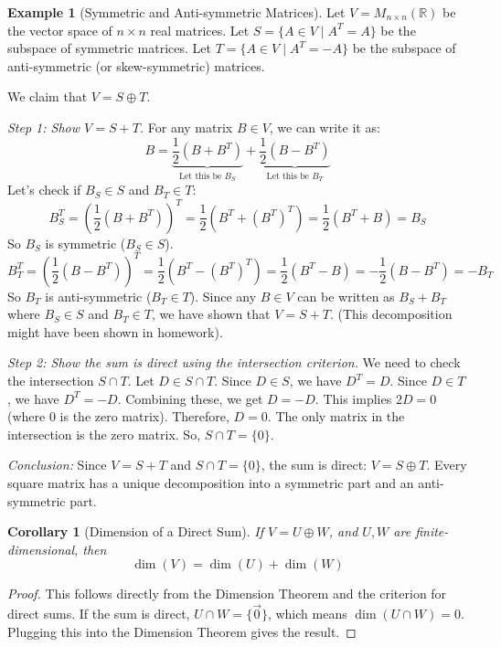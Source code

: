 \documentclass[11pt]{article}
\newtheorem{corollary}[theorem]{Corollary}
\theoremstyle{definition}
\newtheorem{example}[theorem]{Example}
\theoremstyle{remark}
\newcommand{\R}{\mathbb{R}}
\newcommand{\dimn}{\operatorname{dim}}
\newcommand{\intersect}{\cap}
\newcommand{\directsum}{\oplus}
\newcommand{\mat}[1]{M_{#1 \times #1}(\R)} %
\begin{document}
\begin{example}[Symmetric and Anti-symmetric Matrices] \label{ex:matrix_decomp}
Let $V = \mat{n}$ be the vector space of $n \times n$ real matrices.
Let $S = \{ A \in V \mid A^T = A \}$ be the subspace of symmetric matrices.
Let $T = \{ A \in V \mid A^T = -A \}$ be the subspace of anti-symmetric (or skew-symmetric) matrices.

We claim that $V = S \directsum T$.

\textit{Step 1: Show $V = S+T$.}
For any matrix $B \in V$, we can write it as:
\[ B = \underbrace{\frac{1}{2}(B + B^T)}_{\text{Let this be } B_S} + \underbrace{\frac{1}{2}(B - B^T)}_{\text{Let this be } B_T} \]
Let's check if $B_S \in S$ and $B_T \in T$:
\[ B_S^T = \left(\frac{1}{2}(B + B^T)\right)^T = \frac{1}{2}(B^T + (B^T)^T) = \frac{1}{2}(B^T + B) = B_S \]
So $B_S$ is symmetric ($B_S \in S$).
\[ B_T^T = \left(\frac{1}{2}(B - B^T)\right)^T = \frac{1}{2}(B^T - (B^T)^T) = \frac{1}{2}(B^T - B) = -\frac{1}{2}(B - B^T) = -B_T \]
So $B_T$ is anti-symmetric ($B_T \in T$).
Since any $B \in V$ can be written as $B_S + B_T$ where $B_S \in S$ and $B_T \in T$, we have shown that $V = S+T$. (This decomposition might have been shown in homework).

\textit{Step 2: Show the sum is direct using the intersection criterion.}
We need to check the intersection $S \intersect T$. Let $D \in S \intersect T$.
Since $D \in S$, we have $D^T = D$.
Since $D \in T$, we have $D^T = -D$.
Combining these, we get $D = -D$. This implies $2D = 0$ (where $0$ is the zero matrix). Therefore, $D=0$.
The only matrix in the intersection is the zero matrix. So, $S \intersect T = \{0\}$.

\textit{Conclusion:} Since $V=S+T$ and $S \intersect T = \{0\}$, the sum is direct: $V = S \directsum T$. Every square matrix has a unique decomposition into a symmetric part and an anti-symmetric part.
\end{example}

\begin{corollary}[Dimension of a Direct Sum]
If $V = U \directsum W$, and $U, W$ are finite-dimensional, then
\[ \dimn(V) = \dimn(U) + \dimn(W) \]
\end{corollary}
\begin{proof}
This follows directly from the Dimension Theorem and the criterion for direct sums. If the sum is direct, $U \intersect W = \{\vec{0}\}$, which means $\dimn(U \intersect W) = 0$. Plugging this into the Dimension Theorem gives the result.
\end{proof}
\end{document}

